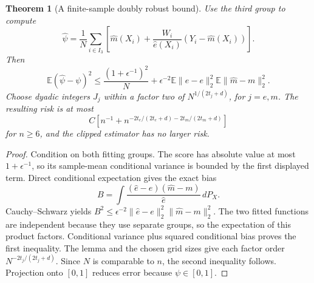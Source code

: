\documentclass[11pt]{article}
\newtheorem{theorem}{Theorem}
\theoremstyle{remark}
\newcommand{\E}{\mathbb E}
\begin{document}
\begin{theorem}[A finite-sample doubly robust bound]
Use the third group to compute
\[
 \widehat\psi=\frac1N\sum_{i\in I_3}
 \left[\widehat m(X_i)+\frac{W_i}{\widehat e(X_i)}
                 (Y_i-\widehat m(X_i))\right].
\]
Then
\[
 \E(\widehat\psi-\psi)^2\leq
 \frac{(1+\epsilon^{-1})^2}{N}
 +\epsilon^{-2}\E\|\widehat e-e\|_2^2
                       \E\|\widehat m-m\|_2^2.
\]
Choose dyadic integers $J_j$ within a factor two of
$N^{1/(2t_j+d)}$, for $j=e,m$. The resulting risk is at most
\[
 C\left[n^{-1}+
 n^{-2t_e/(2t_e+d)-2t_m/(2t_m+d)}\right]
\]
for $n\geq6$, and the clipped estimator has no larger risk.
\end{theorem}
\begin{proof}
Condition on both fitting groups. The score has absolute value at most
$1+\epsilon^{-1}$, so its sample-mean conditional variance is bounded
by the first displayed term. Direct conditional expectation gives the
exact bias
\[
 B=\int\frac{(\widehat e-e)(\widehat m-m)}{\widehat e}\,dP_X.
\]
Cauchy--Schwarz yields
$B^2\leq\epsilon^{-2}\|\widehat e-e\|_2^2\|\widehat m-m\|_2^2$.
The two fitted functions are independent because they use separate
groups, so the expectation of this product factors. Conditional variance
plus squared conditional bias proves the first inequality. The lemma
and the chosen grid sizes give each factor order
$N^{-2t_j/(2t_j+d)}$. Since $N$ is comparable to $n$, the second
inequality follows. Projection onto $[0,1]$ reduces error because
$\psi\in[0,1]$.
\end{proof}
\end{document}
